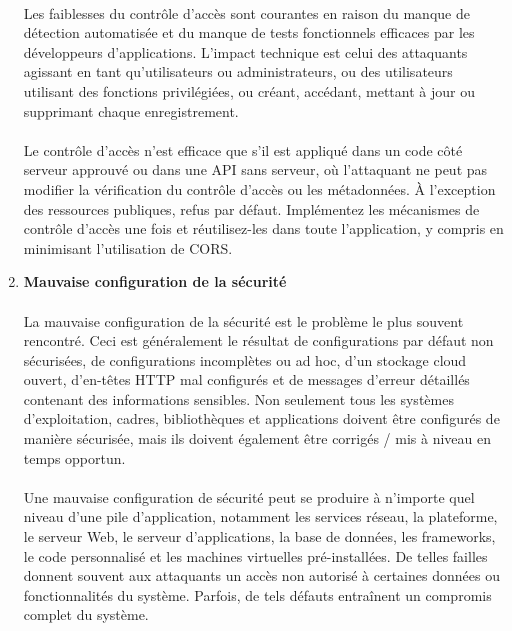 \begin{enumerate}
	\paragraph{}
	Les faiblesses du contrôle d'accès sont courantes en raison du manque de détection automatisée et du manque de tests fonctionnels efficaces par les développeurs d'applications. 
	L'impact technique est celui des attaquants agissant en tant qu'utilisateurs ou administrateurs, ou des utilisateurs utilisant des fonctions privilégiées, ou créant, accédant, mettant à jour ou supprimant chaque enregistrement.
	\paragraph{}
	Le contrôle d'accès n'est efficace que s'il est appliqué dans un code côté serveur approuvé ou dans une API sans serveur, où l'attaquant ne peut pas modifier la vérification du contrôle d'accès ou les métadonnées.
	À l'exception des ressources publiques, refus par défaut.
	Implémentez les mécanismes de contrôle d'accès une fois et réutilisez-les dans toute l'application, y compris en minimisant l'utilisation de CORS.

	\vspace*{0.8cm} \item \textbf{Mauvaise configuration de la sécurité} \vspace*{-0.4cm}
	\paragraph{}
	La mauvaise configuration de la sécurité est le problème le plus souvent rencontré. Ceci est généralement le résultat de configurations par défaut non sécurisées, de configurations incomplètes ou ad hoc, d'un stockage cloud ouvert, d'en-têtes HTTP mal configurés et de messages d'erreur détaillés contenant des informations sensibles. Non seulement tous les systèmes d'exploitation, cadres, bibliothèques et applications doivent être configurés de manière sécurisée, mais ils doivent également être corrigés / mis à niveau en temps opportun.
	\paragraph{}
	Une mauvaise configuration de sécurité peut se produire à n'importe quel niveau d'une pile d'application, notamment les services réseau, la plateforme, le serveur Web, le serveur d'applications, la base de données, les frameworks, le code personnalisé et les machines virtuelles pré-installées.
	De telles failles donnent souvent aux attaquants un accès non autorisé à certaines données ou fonctionnalités du système. Parfois, de tels défauts entraînent un compromis complet du système.

\end{enumerate}
